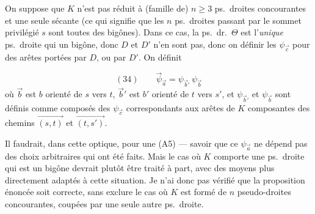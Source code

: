 \documentclass[11pt,a4paper]{article}
\begin{document}
On suppose que $K$ n'est pas réduit à  (famille de) $n \geqslant 3$ ps.\ droites concourantes et une seule sécante (ce qui signifie que les $n$ ps.\ droites passant par le sommet privilégié $s$ sont toutes des bigônes). Dans ce cas, la ps.\ dr.\ $\Theta$ est l'\emph{unique} ps.\ droite qui  un bigône, donc $D$ et $D'$ n'en sont pas, donc on  définir les $\psi_{\vec{c}}$ pour des arêtes  portées par $D$, ou par $D'$. On définit 

\[
(34) \qquad \vec{\psi}_{\vec{a}} = \psi_{\vec{b}'} \, \psi_{\vec{b}}
\]
où $\vec{b}$ est $b$ orienté de $s$ vers $t$, $\vec{b}'$ est $b'$ orienté de $t$ vers $s'$, et $\psi_{\vec{b}'}$ et $\psi_{\vec{b}}$ sont définis comme composés des $\psi_{\vec{c}}$ correspondants aux arêtes de $K$ composantes des chemins $\overrightarrow{(s,t)}$ et $\overrightarrow{(t,s')}$.

Il faudrait, dans cette optique, pour une (A5) --- savoir que ce $\psi_{\vec{a}}$ ne dépend pas des choix arbitraires qui ont été faits. Mais le cas où $K$ comporte une ps.\ droite qui est un bigône \struck{\ill{} \ill{}} devrait plutôt être traité à part, avec des moyens plus directement adaptés à cette situation. Je n'ai donc pas vérifié que la proposition énoncée soit correcte, sans exclure le cas où $K$ est formé de $n$ pseudo-droites concourantes, coupées par une seule autre ps.\ droite.
\end{document}
